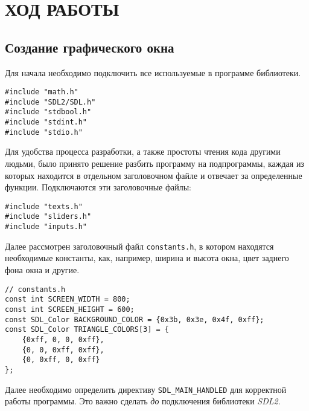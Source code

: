 \documentclass[14pt]{extarticle}
\begin{document}
{
    {
        \par
        \centering\section{ХОД РАБОТЫ}
        \par
    }
    {
        \par
        \subsection{Создание графического окна}
        \label{sec:init}
        \par
    }
    \begin{spacing}{1.5}
        Для начала необходимо подключить все используемые в программе библиотеки.
    \end{spacing}
    \par
    \begin{lstlisting}
#include "math.h"
#include "SDL2/SDL.h"
#include "stdbool.h"
#include "stdint.h"
#include "stdio.h"\end{lstlisting}
    \par
    \begin{spacing}{1.5}
    Для удобства процесса разработки, а также простоты чтения кода другими людьми, было принято решение разбить программу на подпрограммы, каждая из которых находится в отдельном заголовочном файле и отвечает за определенные функции. Подключаются эти заголовочные файлы:
    \end{spacing}
    \par
    \begin{lstlisting}
#include "texts.h"
#include "sliders.h"
#include "inputs.h"\end{lstlisting}
    \begin{spacing}{1.5}
        Далее рассмотрен заголовочный файл \verb|constants.h|, в котором находятся необходимые константы, как, например, ширина и высота окна, цвет заднего фона окна и другие.
    \end{spacing}
    \begin{lstlisting}
// constants.h
const int SCREEN_WIDTH = 800;
const int SCREEN_HEIGHT = 600;
const SDL_Color BACKGROUND_COLOR = {0x3b, 0x3e, 0x4f, 0xff};
const SDL_Color TRIANGLE_COLORS[3] = {
	{0xff, 0, 0, 0xff},
	{0, 0, 0xff, 0xff},
	{0, 0xff, 0, 0xff}
};\end{lstlisting}
    \begin{spacing}{1.5}
    Далее необходимо определить директиву \verb|SDL_MAIN_HANDLED| для корректной работы программы. Это важно сделать \textit{до} подключения библиотеки \textit{SDL2}.\par

\end{spacing}}
\end{document}
